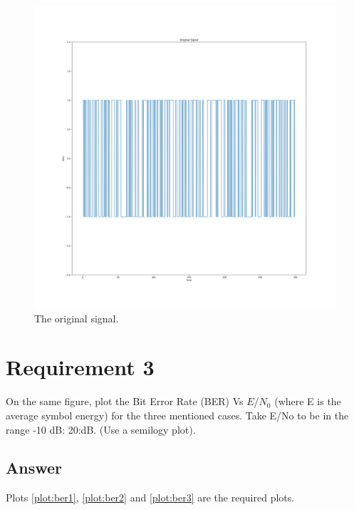 \documentclass[
	12pt, %
	oneside
]{fphw}
\begin{document}
\begin{center}
	\begin{figure}
		\centering
		\includegraphics[width=17cm]{../graphs/orig}
		\caption{The original signal.}
		\label{plot:orig}
	\end{figure}
\end{center}
\clearpage

\section*{Requirement 3}
\begin{problem}
	On the same figure, plot the Bit Error Rate (BER) Vs $E$/$N_0$ (where E is the average symbol
energy) for the three mentioned cases. Take E/No to be in the range -10 dB: 20:dB. (Use a
semilogy plot).
\end{problem}

\subsection*{Answer}
Plots \ref{plot:ber1}, \ref{plot:ber2} and \ref{plot:ber3} are the required plots.
\end{document}
